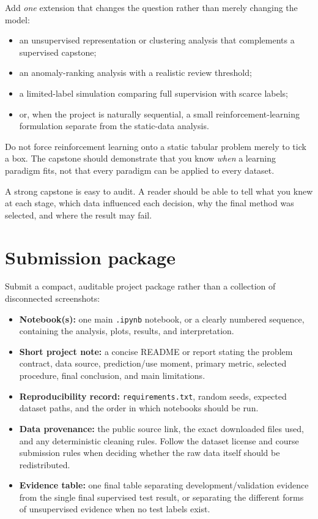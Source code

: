 Add \emph{one} extension that changes the question rather than merely changing the model:
\begin{itemize}
  \item an unsupervised representation or clustering analysis that complements a supervised capstone;
  \item an anomaly-ranking analysis with a realistic review threshold;
  \item a limited-label simulation comparing full supervision with scarce labels;
  \item or, when the project is naturally sequential, a small reinforcement-learning formulation separate from the static-data analysis.
\end{itemize}

Do not force reinforcement learning onto a static tabular problem merely to tick a box. The capstone should demonstrate that you know \emph{when} a learning paradigm fits, not that every paradigm can be applied to every dataset.

\begin{keyidea}
A strong capstone is easy to audit. A reader should be able to tell what you knew at each stage, which data influenced each decision, why the final method was selected, and where the result may fail.
\end{keyidea}

\section*{Submission package}

Submit a compact, auditable project package rather than a collection of disconnected screenshots:

\begin{itemize}
  \item \textbf{Notebook(s):} one main \texttt{.ipynb} notebook, or a clearly numbered sequence, containing the analysis, plots, results, and interpretation.
  \item \textbf{Short project note:} a concise README or report stating the problem contract, data source, prediction/use moment, primary metric, selected procedure, final conclusion, and main limitations.
  \item \textbf{Reproducibility record:} \texttt{requirements.txt}, random seeds, expected dataset paths, and the order in which notebooks should be run.
  \item \textbf{Data provenance:} the public source link, the exact downloaded files used, and any deterministic cleaning rules. Follow the dataset license and course submission rules when deciding whether the raw data itself should be redistributed.
  \item \textbf{Evidence table:} one final table separating development/validation evidence from the single final supervised test result, or separating the different forms of unsupervised evidence when no test labels exist.
\end{itemize}

